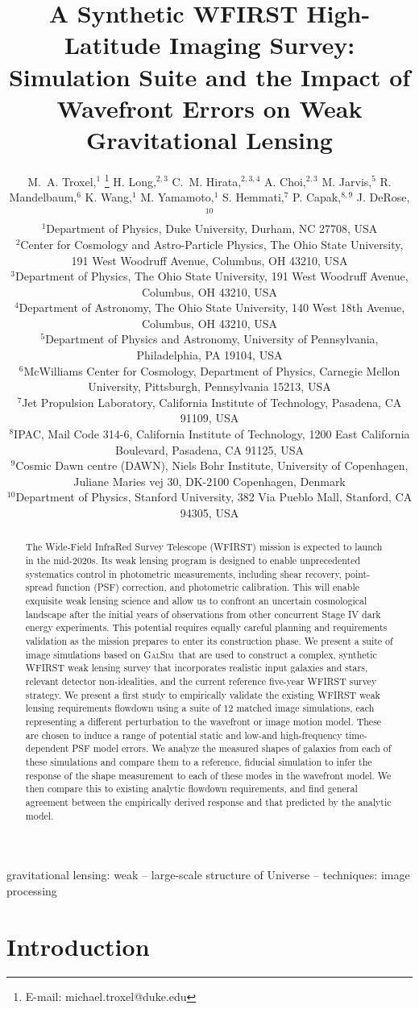 \documentclass[usenatbib]{mnras}
\title[A Synthetic WFIRST High-Latitude Imaging Survey]{A Synthetic WFIRST High-Latitude Imaging Survey: 
Simulation Suite and the Impact of Wavefront Errors on Weak Gravitational Lensing}
\author[M.~A. Troxel et al.]{M.~A. Troxel,$^1$ \thanks{E-mail: michael.troxel@duke.edu}
H. Long,$^{2,3}$
C.~M. Hirata,$^{2,3,4}$
A. Choi,$^{2,3}$
M. Jarvis,$^5$
R. Mandelbaum,$^6$
\newauthor
K. Wang,$^1$
M. Yamamoto,$^1$
S. Hemmati,$^7$
P. Capak,$^{8,9}$
J. DeRose,$^{10}$\\
$^{1}$Department of Physics, Duke University, Durham, NC 27708, USA\\
$^{2}$Center for Cosmology and Astro-Particle Physics, The Ohio State University, 191 West Woodruff Avenue, Columbus, OH 43210, USA\\
$^{3}$Department of Physics, The Ohio State University, 191 West Woodruff Avenue, Columbus, OH 43210, USA\\
$^{4}$Department of Astronomy, The Ohio State University, 140 West 18th Avenue, Columbus, OH 43210, USA\\
$^{5}$Department of Physics and Astronomy, University of Pennsylvania, Philadelphia, PA 19104, USA\\
$^{6}$McWilliams Center for Cosmology, Department of Physics, Carnegie Mellon University, Pittsburgh, Pennsylvania 15213, USA\\
$^{7}$Jet Propulsion Laboratory, California Institute of Technology, Pasadena, CA 91109, USA\\
$^{8}$IPAC, Mail Code 314-6, California Institute of Technology, 1200 East California Boulevard, Pasadena, CA 91125, USA\\
$^{9}$Cosmic Dawn centre (DAWN), Niels Bohr Institute, University of Copenhagen, Juliane Maries vej 30, DK-2100 Copenhagen, Denmark\\
$^{10}$Department of Physics, Stanford University, 382 Via Pueblo Mall, Stanford, CA 94305, USA
}
\newcommand{\galsim}{\textsc{GalSim}}
\begin{document}
\label{firstpage}
\pagerange{\pageref{firstpage}--\pageref{lastpage}}
\maketitle

\begin{abstract}
The Wide-Field InfraRed Survey Telescope (WFIRST) mission is expected to launch in the mid-2020s. Its weak lensing program is designed to enable unprecedented systematics control in photometric measurements, including shear recovery, point-spread function (PSF) correction, and photometric calibration. This will enable exquisite weak lensing science and allow us to confront an uncertain cosmological landscape after the initial years of observations from other concurrent Stage IV dark energy experiments. This potential requires equally careful planning and requirements validation as the mission prepares to enter its construction phase. We present a suite of image simulations based on \galsim\ that are used to construct a complex, synthetic WFIRST weak lensing survey that incorporates realistic input galaxies and stars, relevant detector non-idealities, and the current reference five-year WFIRST survey strategy. We present a first study to empirically validate the existing WFIRST weak lensing requirements flowdown using a suite of 12 matched image simulations, each representing a different perturbation to the wavefront or image motion model. These are chosen to induce a range of potential static and low-and high-frequency time-dependent PSF model errors. We analyze the measured shapes of galaxies from each of these simulations and compare them to a reference, fiducial simulation to infer the response of the shape measurement to each of these modes in the wavefront model. We then compare this to existing analytic flowdown requirements, and find general agreement between the empirically derived response and that predicted by the analytic model.
\end{abstract}

\begin{keywords}
gravitational lensing: weak -- large-scale structure of Universe -- techniques: image processing
\end{keywords}

\maketitle


\section{Introduction}\label{sec:intro}
\end{document}
